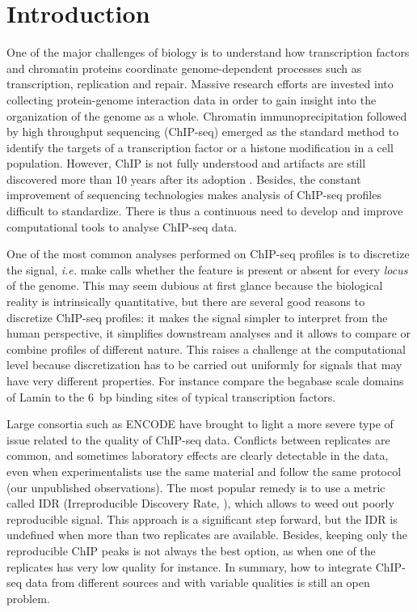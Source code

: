 \documentclass{bioinfo}
\begin{document}
\section{Introduction}
One of the major challenges of biology is to understand how transcription
factors and chromatin proteins coordinate genome-dependent processes
such as transcription, replication and repair. Massive research efforts
are invested into collecting protein-genome interaction data in order
to gain insight into the organization of the genome as a whole. Chromatin
immunoprecipitation followed by high throughput sequencing (ChIP-seq)
emerged as the standard method to identify the targets of a transcription
factor or a histone modification in a cell population. However, ChIP is not
fully understood and artifacts are still discovered more than 10 years after
its adoption \citep{pmid24349523, pmid24173036}. Besides, the constant
improvement of sequencing technologies makes analysis of ChIP-seq profiles
difficult to standardize. There is thus a continuous need to develop and
improve computational tools to analyse ChIP-seq data.

One of the most common analyses performed on ChIP-seq profiles is to
discretize the signal, \textit{i.e.} make calls whether the feature is
present or absent for every \textit{locus} of the genome. This may seem
dubious at first glance because the biological reality is intrinsically
quantitative, but there are several good reasons to discretize ChIP-seq
profiles: it makes the signal simpler to interpret from the human
perspective, it simplifies downstream analyses and it allows to compare or
combine profiles of different nature. This raises a challenge at the
computational level because discretization has to be carried out uniformly
for signals that may have very different properties. For instance compare
the begabase scale domains of Lamin \citep{pmid18463634} to the 6~bp
binding sites of typical transcription factors.

Large consortia such as ENCODE have brought to light a more severe type
of issue related to the quality of ChIP-seq data. Conflicts between
replicates are common, and
sometimes laboratory effects are clearly detectable in the data,
even when experimentalists use the same material and follow the same
protocol (our unpublished observations). The most popular remedy is to
use a metric called IDR (Irreproducible Discovery Rate, \citealp{li2011}),
which allows to weed
out poorly reproducible signal. This approach is a significant step
forward, but the IDR is undefined when more than two replicates are
available. Besides, keeping only the reproducible ChIP peaks is not
always the best option, as when one of the replicates has very low quality
for instance. In summary, how to integrate ChIP-seq data from different
sources and with variable qualities is still an open problem.
\end{document}
